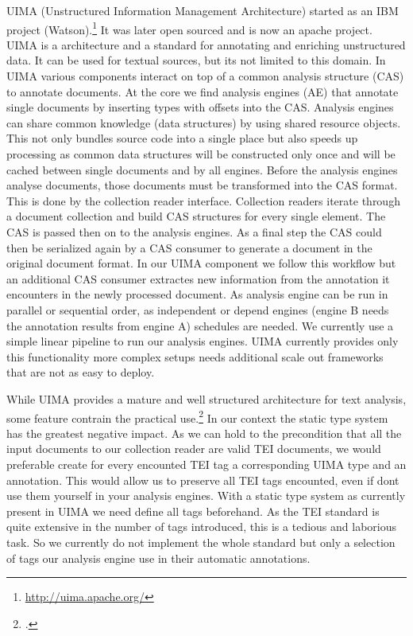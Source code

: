 \documentclass[12pt, draft]{article}
\begin{document}
UIMA (Unstructured Information Management Architecture) started as an
 IBM project (Watson).\footnote{\url{http://uima.apache.org/}}
It was later open sourced and is now an apache project.
UIMA is a architecture and a standard for annotating and enriching unstructured data.
It can be used for textual sources, but its not limited to this domain.
In UIMA various components interact on top of a common analysis structure (CAS)
to annotate documents. At the core we find analysis engines (AE) that
annotate single documents by inserting types with offsets into the CAS.
Analysis engines can share common knowledge (data structures) by
using shared resource objects. This not only bundles
source code into a single place but also speeds up processing as
common data structures will be constructed only once and will be cached
between single documents and by all engines.
Before the analysis engines analyse documents, those documents
must be transformed into the CAS format.
This is done by the collection reader interface. Collection readers
iterate through a document collection and build CAS structures
for every single element. The CAS is passed then on to the analysis engines.
As a final step the CAS could then be serialized again
by a CAS consumer to generate a document in the original document format.
In our UIMA component we follow this workflow but an additional CAS consumer
extractes new information from the annotation it encounters
in the newly processed document.  As analysis engine can be run in
parallel or sequential order, as independent or
depend engines (engine B needs the annotation results from engine A)
schedules are needed. We currently use a simple linear pipeline to
run our analysis engines. UIMA currently provides only this functionality
more complex setups needs additional scale out frameworks that are
not as easy to deploy.

While UIMA provides a mature and well structured architecture for text analysis,
some feature contrain the practical use.\footcite{Goetz:2014}
In our context the static type system has the greatest negative impact.
As we can hold to the precondition that all the input documents to our
collection reader are valid TEI documents, we would preferable
create for every encounted TEI tag a corresponding UIMA type and an annotation. 
This would allow us to preserve all TEI tags encounted, even if dont use them
yourself in your analysis engines. With a static type system
as currently present in UIMA we need define all tags beforehand.
As the TEI standard is quite extensive in the number of tags introduced,
this is a tedious and laborious task.
So we currently do not implement the whole standard but only a selection of tags
our analysis engine use in their automatic annotations.
\end{document}
